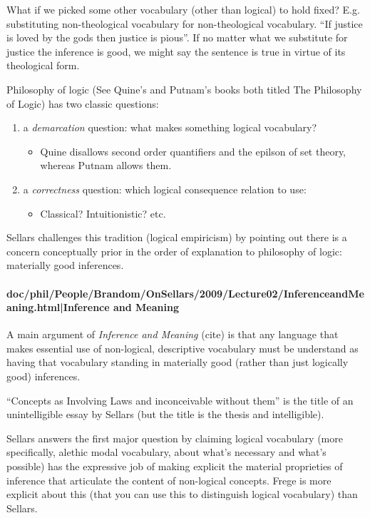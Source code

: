 \documentclass[12pt,a4paper]{report}
\begin{document}
What if we picked some other vocabulary (other than logical) to hold fixed? E.g.
substituting non-theological vocabulary for non-theological vocabulary.
``If justice is loved by the gods then justice is pious''. If no matter what we
substitute for justice the inference is good, we might say the sentence is true
in virtue of its theological form.

Philosophy of logic (See Quine's and Putnam's books both titled The Philosophy
of Logic) has two classic questions:
\begin{enumerate}
    \item a \emph{demarcation} question: what makes something logical vocabulary?
     \begin{itemize}
        \item Quine disallows second order quantifiers and the epilson of set
              theory, whereas Putnam allows them.
     \end{itemize}
    \item a \emph{correctness} question: which logical consequence relation to use:
      \begin{itemize}
      \item Classical? Intuitionistic? etc.
      \end{itemize}
\end{enumerate}

Sellars challenges this tradition (logical empiricism) by pointing out there is
a concern conceptually prior in the order of explanation to philosophy of
logic: materially good inferences.

\paragraph{doc/phil/People/Brandom/OnSellars/2009/Lecture02/InferenceandMeaning.html|Inference and Meaning}

A main argument of \textit{Inference and Meaning} (cite) is that any language that makes essential use of non-logical, descriptive vocabulary must be understand as having that vocabulary standing in materially good (rather than just logically good) inferences.

``Concepts as Involving Laws and inconceivable without them'' is the title of an unintelligible essay by Sellars (but the title is the thesis and intelligible).

Sellars answers the first major question by claiming logical vocabulary (more specifically, alethic modal vocabulary, about what's necessary and what's possible) has the expressive job of making explicit the material proprieties of inference that articulate the content of non-logical concepts. Frege is more explicit about this (that you can use this to distinguish logical vocabulary) than Sellars.
\end{document}
